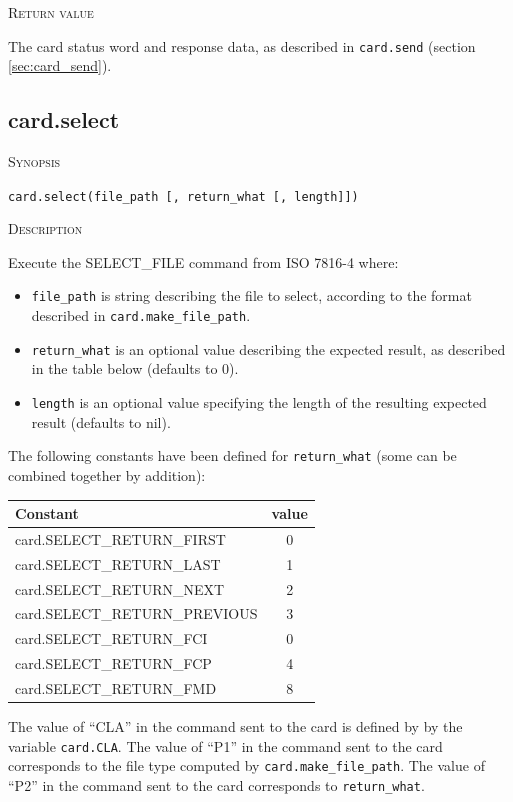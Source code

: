 \documentclass[11pt]{report}
\newcommand{\mansection}[1]{\vspace{0.5em}\par\noindent\textsc{#1}\vspace{0.5em}\par}
\newcommand{\syn}[1]{\texttt{#1}}
\begin{document}
\mansection{Return value}
  The card status word and response data, as described in \syn{card.send} (section \ref{sec:card_send}).


\subsection{card.select}

\mansection{Synopsis}
\syn{card.select(file\_path [, return\_what [, length]])}

\mansection{Description}
  Execute the SELECT\_FILE command from ISO 7816-4 where:
  \begin{itemize}
  \item{\syn{file\_path} is string describing the file to select, according to the format described in \syn{card.make\_file\_path}.}
  \item{\syn{return\_what} is an optional value describing the expected result, as described in the table below (defaults to 0).}
  \item{\syn{length} is an optional value specifying the length of the resulting expected result (defaults to nil).}
  \end{itemize}

  The following constants have been defined for \syn{return\_what} (some can be combined together by addition):

  \vspace{2em}
  \begin{tabular}{|l|c|}
  \hline
  Constant & value \\
  \hline
  card.SELECT\_RETURN\_FIRST      & 0 \\
  card.SELECT\_RETURN\_LAST       & 1 \\
  card.SELECT\_RETURN\_NEXT       & 2 \\
  card.SELECT\_RETURN\_PREVIOUS   & 3 \\
  card.SELECT\_RETURN\_FCI        & 0 \\
  card.SELECT\_RETURN\_FCP        & 4 \\
  card.SELECT\_RETURN\_FMD        & 8 \\
  \hline
  \end{tabular}
  \vspace{2em}

  The value of ``CLA'' in the command sent to the card is defined by by the variable \syn{card.CLA}.
  The value of ``P1'' in the command sent to the card corresponds to the file type computed by \syn{card.make\_file\_path}.
  The value of ``P2'' in the command sent to the card corresponds to \syn{return\_what}.
\end{document}
